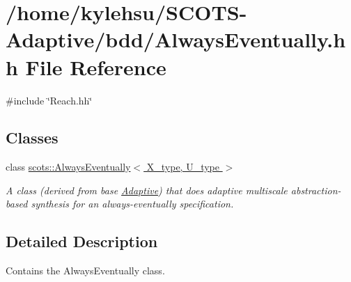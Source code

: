\hypertarget{AlwaysEventually_8hh}{}\section{/home/kylehsu/\+S\+C\+O\+T\+S-\/\+Adaptive/bdd/\+Always\+Eventually.hh File Reference}
\label{AlwaysEventually_8hh}
{\ttfamily \#include \char`\"{}Reach.\+hh\char`\"{}}\newline
\subsection*{Classes}
\begin{DoxyCompactItemize}
\item 
class \hyperlink{classscots_1_1AlwaysEventually}{scots\+::\+Always\+Eventually$<$ X\+\_\+type, U\+\_\+type $>$}
\begin{DoxyCompactList}\small\item\em A class (derived from base \hyperlink{classscots_1_1Adaptive}{Adaptive}) that does adaptive multiscale abstraction-\/based synthesis for an always-\/eventually specification. \end{DoxyCompactList}\end{DoxyCompactItemize}


\subsection{Detailed Description}
Contains the Always\+Eventually class. 